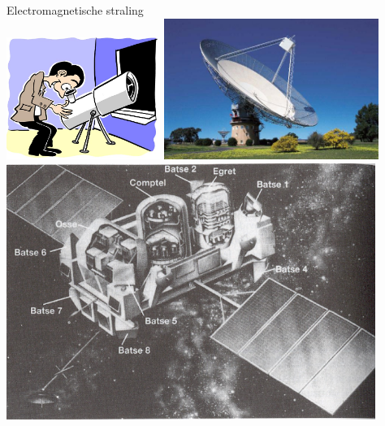 \twocolumn
\begin{center}
{\blue Electromagnetische straling}\\[5mm]
\includegraphics[keepaspectratio,width=5cm]{optical2}
\includegraphics[keepaspectratio,width=7cm]{radio2}\\[1.5cm]
\includegraphics[keepaspectratio,width=12cm]{cgro}
\end{center}

\newpage

